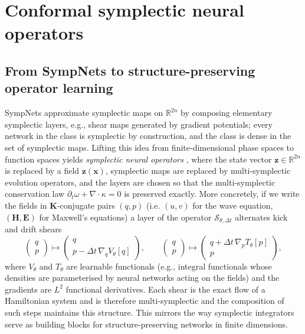 \documentclass[11pt]{article}
\theoremstyle{definition}
\theoremstyle{remark}
\newcommand{\R}{\mathbb{R}}
\newcommand{\bz}{\bm{z}}
\newcommand{\bx}{\bm{x}}
\newcommand{\bE}{\bm{E}}
\newcommand{\bH}{\bm{H}}
\newcommand{\bK}{\bm{K}}
\newcommand{\So}{\mathcal{S}}
\begin{document}
\section{Conformal symplectic neural operators}
\label{sec:operators}

\subsection{From SympNets to structure-preserving operator learning}

SympNets \cite{jin2020sympnets} approximate symplectic maps on
$\R^{2n}$ by composing elementary symplectic layers, e.g., shear maps
generated by gradient potentials; every network in the class is
symplectic by construction, and the class is dense in the set of
symplectic maps.  Lifting this idea from finite-dimensional phase
spaces to function spaces yields \emph{symplectic neural operators} \cite{makara2026symplecticneuraloperatorslearning}, where the state vector $\bz\in\R^{2n}$ is replaced by a field
$\bz(\bx)$, symplectic maps are replaced by multi-symplectic evolution
operators, and the layers are chosen so that the multi-symplectic
conservation law $\partial_t\omega+\nabla\!\cdot\!\kappa=0$ is preserved exactly.
More concretely, if we write the fields in $\bK$-conjugate pairs
$(q,p)$ (i.e. $(u,v)$ for the wave equation, $(\bH,\bE)$ for Maxwell's
equations) a layer of the operator $\So_{\theta,\Delta t}$ alternates
kick and drift shears
\begin{equation}
\label{eq:sympnet-layers}
\begin{pmatrix} q \\ p\end{pmatrix}
\mapsto
\begin{pmatrix} q \\ p - \Delta t\,\nabla_q V_\theta[q]\end{pmatrix},
\qquad
\begin{pmatrix} q \\ p\end{pmatrix}
\mapsto
\begin{pmatrix} q + \Delta t\,\nabla_p T_\theta[p]\\
p\end{pmatrix},
\end{equation}
where $V_\theta$ and $T_\theta$ are learnable functionals (e.g.,
integral functionals whose densities are parameterised by neural
networks acting on the fields) and the gradients are
$L^2$ functional derivatives.  Each shear is the exact flow of a
Hamiltonian system and is therefore multi-symplectic and the composition
of such steps maintains this structure.  This mirrors the way symplectic integrators serve as building blocks for structure-preserving networks in finite dimensions.
\end{document}

